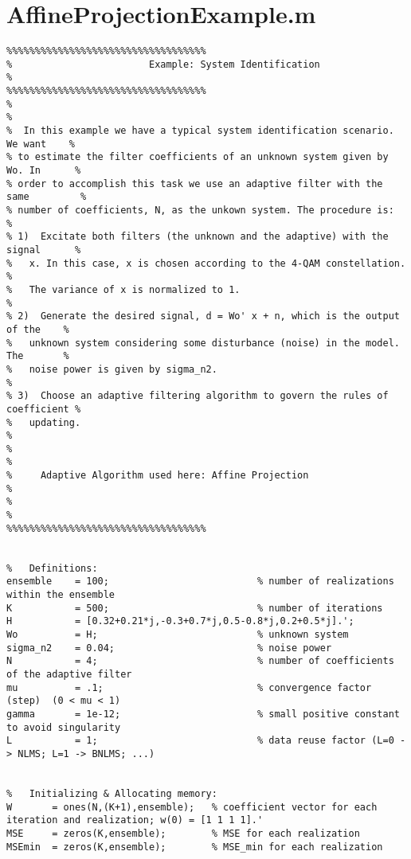 \section{AffineProjectionExample.m}
\begin{lstlisting}
%%%%%%%%%%%%%%%%%%%%%%%%%%%%%%%%%%%
%                        Example: System Identification                         %
%%%%%%%%%%%%%%%%%%%%%%%%%%%%%%%%%%%
%                                                                               %
%  In this example we have a typical system identification scenario. We want    %
% to estimate the filter coefficients of an unknown system given by Wo. In      %
% order to accomplish this task we use an adaptive filter with the same         %
% number of coefficients, N, as the unkown system. The procedure is:            %
% 1)  Excitate both filters (the unknown and the adaptive) with the signal      %
%   x. In this case, x is chosen according to the 4-QAM constellation.          %
%   The variance of x is normalized to 1.                                       %
% 2)  Generate the desired signal, d = Wo' x + n, which is the output of the    %
%   unknown system considering some disturbance (noise) in the model. The       %
%   noise power is given by sigma_n2.                                           %
% 3)  Choose an adaptive filtering algorithm to govern the rules of coefficient %
%   updating.                                                                   %
%                                                                               %
%     Adaptive Algorithm used here: Affine Projection                           %
%                                                                               %
%%%%%%%%%%%%%%%%%%%%%%%%%%%%%%%%%%%


%   Definitions:
ensemble    = 100;                          % number of realizations within the ensemble
K           = 500;                          % number of iterations
H           = [0.32+0.21*j,-0.3+0.7*j,0.5-0.8*j,0.2+0.5*j].';
Wo          = H;                            % unknown system
sigma_n2    = 0.04;                         % noise power
N           = 4;                            % number of coefficients of the adaptive filter
mu          = .1;                           % convergence factor (step)  (0 < mu < 1)
gamma       = 1e-12;                        % small positive constant to avoid singularity
L           = 1;                            % data reuse factor (L=0 -> NLMS; L=1 -> BNLMS; ...)


%   Initializing & Allocating memory:
W       = ones(N,(K+1),ensemble);   % coefficient vector for each iteration and realization; w(0) = [1 1 1 1].'
MSE     = zeros(K,ensemble);        % MSE for each realization
MSEmin  = zeros(K,ensemble);        % MSE_min for each realization



\end{lstlisting}

